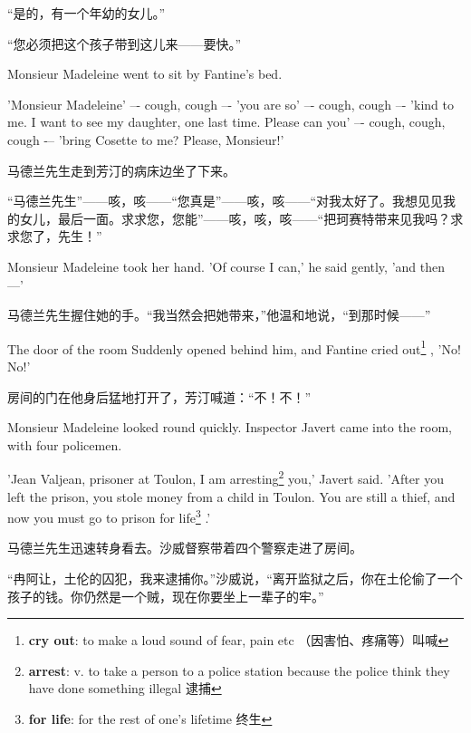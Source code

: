 \documentclass[fontset=ubuntu, zihao=5]{ctexart}
\begin{document}
\begin{paracol}{2}
“是的，有一个年幼的女儿。”


“您必须把这个孩子带到这儿来——要快。”

\switchcolumn*

Monsieur Madeleine went to sit by Fantine's bed.

'Monsieur Madeleine' –- cough, cough –- 'you are so' –- cough, cough –- 'kind to me. I want to see my daughter, one last time. Please can you' –- cough, cough, cough -– 'bring Cosette to me? Please, Monsieur!'

\switchcolumn

马德兰先生走到芳汀的病床边坐了下来。


“马德兰先生”——咳，咳——“您真是”——咳，咳——“对我太好了。我想见见我的女儿，最后一面。求求您，您能”——咳，咳，咳——“把珂赛特带来见我吗？求求您了，先生！”

\switchcolumn*

Monsieur Madeleine took her hand. 'Of course I can,' he said gently, 'and
then ---'

\switchcolumn

马德兰先生握住她的手。“我当然会把她带来，”他温和地说，“到那时候——”

\switchcolumn*

The door of the room Suddenly opened behind him, and Fantine cried out\footnote{\textbf{cry out}: to make a loud sound of fear, pain etc （因害怕、疼痛等）叫喊}
, 'No! No!'

\switchcolumn

房间的门在他身后猛地打开了，芳汀喊道：“不！不！”

\switchcolumn*

Monsieur Madeleine looked round quickly. Inspector Javert came into the room, with four policemen.


'Jean Valjean, prisoner at Toulon, I am arresting\footnote{\textbf{arrest}:  v. to take a person to a police station because the police think they have done something illegal 逮捕}
 you,' Javert said. 'After you left the prison, you stole money from a child in Toulon. You are still a thief, and now you must go to prison for life\footnote{\textbf{for life}: for the rest of one's lifetime 终生}
.'

\switchcolumn

马德兰先生迅速转身看去。沙威督察带着四个警察走进了房间。


“冉阿让，土伦的囚犯，我来逮捕你。”沙威说，“离开监狱之后，你在土伦偷了一个孩子的钱。你仍然是一个贼，现在你要坐上一辈子的牢。”

\switchcolumn*


\end{paracol}
\end{document}
